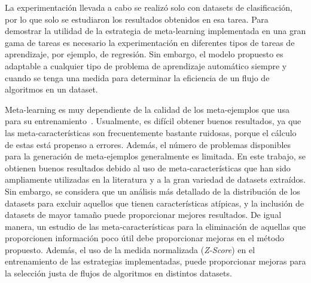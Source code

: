 \documentclass[a4paper,12pt]{article}
\begin{document}
La experimentación llevada a cabo se realizó solo con datasets de clasificación, por lo que solo se estudiaron los resultados obtenidos en esa tarea. Para demostrar la utilidad de la estrategia de meta-learning implementada en una gran gama de tareas es necesario la experimentación en diferentes tipos de tareas de aprendizaje, por ejemplo, de regresión.  Sin embargo, el modelo propuesto es adaptable a cualquier tipo de problema de aprendizaje automático siempre y cuando se tenga una medida para determinar la eficiencia de un flujo de algoritmos en un dataset. %

Meta-learning es muy dependiente de la calidad de los meta-ejemplos que usa para su entrenamiento~\cite{gomes2012combining}. Usualmente, es difícil obtener buenos resultados, ya que las meta-características son frecuentemente bastante ruidosas, porque el cálculo de estas está propenso a errores. Además, el número de problemas disponibles para la generación de meta-ejemplos generalmente es limitada. En este trabajo, se obtienen buenos resultados debido al uso de meta-características que han sido ampliamente utilizadas en la literatura y a la gran variedad de datasets extraídos. Sin embargo, se considera que un análisis más detallado de la distribución de los datasets para excluir aquellos que tienen características atípicas, y la inclusión de datasets de mayor tamaño puede proporcionar mejores resultados. De igual manera, un estudio de las meta-características para la eliminación de aquellas que proporcionen información poco útil debe proporcionar mejoras en el método propuesto. Además, el uso de la medida normalizada (\textit{Z-Score}) en el entrenamiento de las estrategias implementadas, puede proporcionar mejoras para la selección justa de flujos de algoritmos en distintos datasets.


\end{document}
